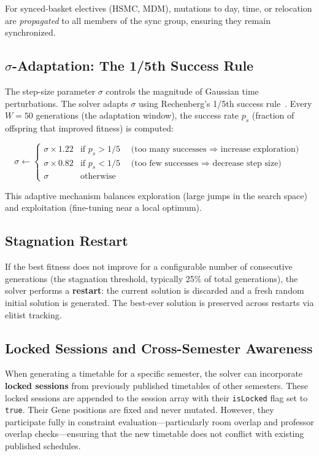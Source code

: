For synced-basket electives (HSMC, MDM), mutations to day, time, or relocation are \emph{propagated} to all members of the sync group, ensuring they remain synchronized.

\subsection{$\sigma$-Adaptation: The 1/5th Success Rule}

The step-size parameter $\sigma$ controls the magnitude of Gaussian time perturbations. The solver adapts $\sigma$ using Rechenberg's 1/5th success rule~\cite{rechenberg1973evolution}. Every $W = 50$ generations (the adaptation window), the success rate $p_s$ (fraction of offspring that improved fitness) is computed:

\begin{equation}
    \sigma \leftarrow
    \begin{cases}
        \sigma \times 1.22 & \text{if } p_s > 1/5 \quad \text{(too many successes $\Rightarrow$ increase exploration)} \\
        \sigma \times 0.82 & \text{if } p_s < 1/5 \quad \text{(too few successes $\Rightarrow$ decrease step size)} \\
        \sigma & \text{otherwise}
    \end{cases}
\end{equation}

This adaptive mechanism balances exploration (large jumps in the search space) and exploitation (fine-tuning near a local optimum).

\subsection{Stagnation Restart}

If the best fitness does not improve for a configurable number of consecutive generations (the stagnation threshold, typically 25\% of total generations), the solver performs a \textbf{restart}: the current solution is discarded and a fresh random initial solution is generated. The best-ever solution is preserved across restarts via elitist tracking.

\subsection{Locked Sessions and Cross-Semester Awareness}

When generating a timetable for a specific semester, the solver can incorporate \textbf{locked sessions} from previously published timetables of other semesters. These locked sessions are appended to the session array with their \texttt{isLocked} flag set to \texttt{true}. Their Gene positions are fixed and never mutated. However, they participate fully in constraint evaluation---particularly room overlap and professor overlap checks---ensuring that the new timetable does not conflict with existing published schedules.


